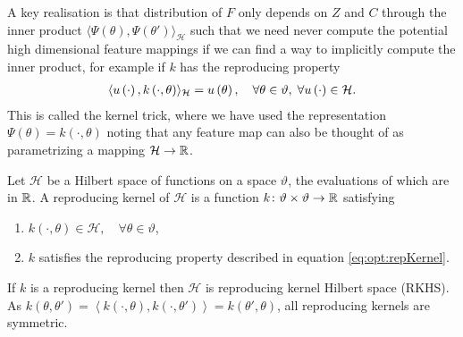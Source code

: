 A key realisation is that distribution of $F$ only depends on $Z$ and $C$ through the inner product $\langle\Psi\left(\theta\right), \Psi\left(\theta'\right)\rangle_{\mathcal{H}}$ such that we need never compute the potential high dimensional feature mappings if we can find a way to implicitly compute the inner product, for example if $k$ has the reproducing property 
\begin{align}
\label{eq:opt:repKernel}
\langle u \left(\cdot\right), k\left(\cdot,\theta\right)\rangle_{\mathcal{H}} = u\left(\theta\right), \quad \forall \theta \in \vartheta, \; \forall u\left(\cdot\right) \in \mathcal{H}.
\end{align}
This is called the kernel trick, where we have used the representation $\Psi\left(\theta\right) = k\left(\cdot,\theta\right)$ noting that any feature map can also be thought of as parametrizing a mapping $\mathcal{H} \rightarrow \mathbb{R}$.  
\begin{definition}{}
	\label{def:opt:RKHS}
	Let $\mathcal{H}$ be a Hilbert space of functions on a space $\vartheta$, the evaluations of which are in $\mathbb{R}$.  A reproducing kernel of $\mathcal{H}$ is a function $k \colon \vartheta \times \vartheta \rightarrow \mathbb{R}$ satisfying
	\begin{enumerate}
		\item $k\left(\cdot,\theta\right) \in \mathcal{H}, \quad \forall \theta \in \vartheta$,
		\item $k$ satisfies the reproducing property described in equation \eqref{eq:opt:repKernel}.
	\end{enumerate}
	If $k$ is a reproducing kernel then $\mathcal{H}$ is reproducing kernel Hilbert space (RKHS).  As $k\left(\theta,\theta'\right) = \left\langle k\left(\cdot,\theta\right), k\left(\cdot,\theta'\right)\right\rangle = k\left(\theta',\theta\right)$, all reproducing kernels are symmetric.
\end{definition}

